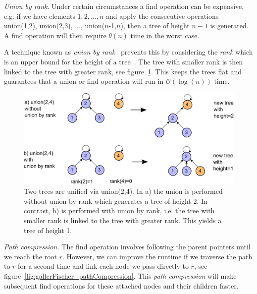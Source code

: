 \documentclass[a4paper,12pt, titlepage]{article}  %
\begin{document}
\noindent \emph{Union by rank}. Under certain circumstances a find operation can be expensive, e.g. if we have elements 
$1,2, ...,n$ and apply the consecutive operations union(1,2), union(2,3), ..., union($n$-1,$n$), then 
a tree of height $n-1$ is generated. A find operation will then require $\theta(n)$ time in the worst case.

A technique known as \emph{union by rank}~\cite{tarjan83} prevents this by considering the \emph{rank} which 
is an upper bound for the height of a tree~\cite{tarjan_leeuwen84, tarjan_golumbic}. The tree with smaller rank is then linked to the tree with greater rank, 
see figure~\ref{fig:gallerFischer_unionByRank}.
This keeps the trees flat and guarantees that a union or find operation will run in $\mathcal{O}(\log(n))$ time. 

\begin{figure}[ht]
	\centering
	\includegraphics[scale=0.5]{./figures/gallerFischer_unionByRank.pdf}
	\caption{Two trees are unified via union(2,4). In a) the union is performed without union by rank which
	        generates a tree of height 2. In contrast, b) is performed with union by rank, i.e. the tree with smaller
	        rank is linked to the tree with greater rank. This yields a tree of height 1.}
	\label{fig:gallerFischer_unionByRank}
\end{figure}

\noindent \emph{Path compression.} The find operation involves following the parent pointers until we reach the
root $r$. However, we can improve the runtime if we traverse the path to $r$ for a second time and link 
each node we pass directly to $r$, see figure~\ref{fig:gallerFischer_pathCompression}. This \emph{path compression} will make subsequent find operations 
for these attached nodes and their children faster. 
\end{document}
